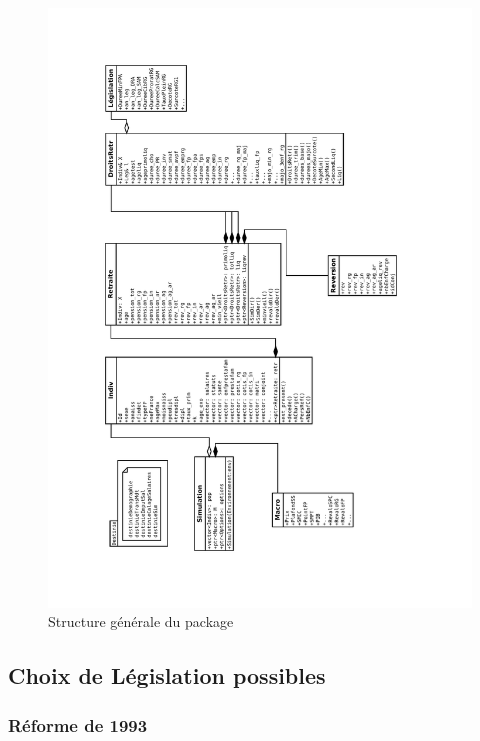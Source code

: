 \begin{landscape}
\begin{figure}
\caption{Structure générale du package}
\label{fig:structGenePack}
\includegraphics[scale=0.85,angle=270,origin=c]{Diagramme2.pdf}
\end{figure}
\end{landscape}


\subsection{Choix de Législation possibles}

\subsubsection{Réforme de 1993}

